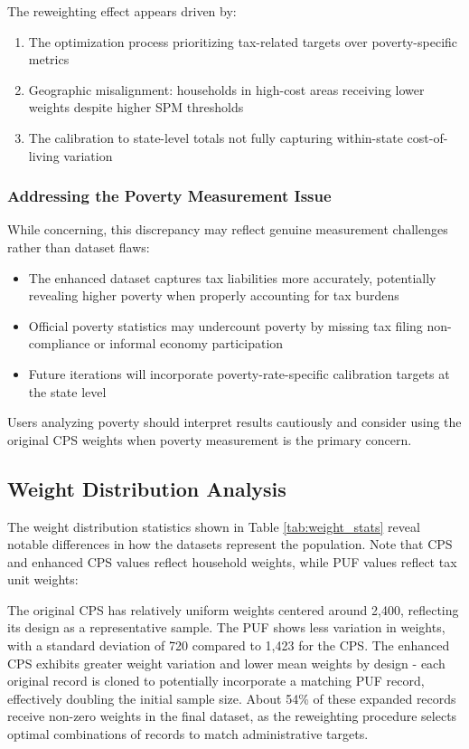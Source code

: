 The reweighting effect appears driven by:
\begin{enumerate}
    \item The optimization process prioritizing tax-related targets over poverty-specific metrics
    \item Geographic misalignment: households in high-cost areas receiving lower weights despite higher SPM thresholds
    \item The calibration to state-level totals not fully capturing within-state cost-of-living variation
\end{enumerate}

\subsubsection{Addressing the Poverty Measurement Issue}

While concerning, this discrepancy may reflect genuine measurement challenges rather than dataset flaws:
\begin{itemize}
    \item The enhanced dataset captures tax liabilities more accurately, potentially revealing higher poverty when properly accounting for tax burdens
    \item Official poverty statistics may undercount poverty by missing tax filing non-compliance or informal economy participation
    \item Future iterations will incorporate poverty-rate-specific calibration targets at the state level
\end{itemize}

Users analyzing poverty should interpret results cautiously and consider using the original CPS weights when poverty measurement is the primary concern.

\subsection{Weight Distribution Analysis}

The weight distribution statistics shown in Table \ref{tab:weight_stats} reveal notable differences in how the datasets represent the population. Note that CPS and enhanced CPS values reflect household weights, while PUF values reflect tax unit weights:



The original CPS has relatively uniform weights centered around 2,400, reflecting its design as a representative sample. The PUF shows less variation in weights, with a standard deviation of 720 compared to 1,423 for the CPS. The enhanced CPS exhibits greater weight variation and lower mean weights by design - each original record is cloned to potentially incorporate a matching PUF record, effectively doubling the initial sample size. About 54\% of these expanded records receive non-zero weights in the final dataset, as the reweighting procedure selects optimal combinations of records to match administrative targets.

